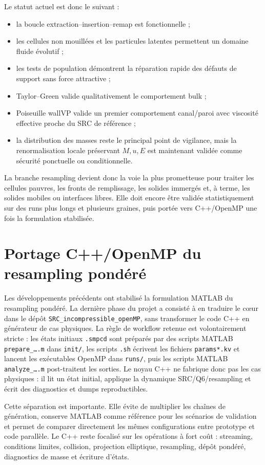 \documentclass[11pt,a4paper]{article}
\begin{document}
Le statut actuel est donc le suivant :
\begin{itemize}
  \item la boucle extraction--insertion--remap est fonctionnelle ;
  \item les cellules non mouillées et les particules latentes permettent un domaine fluide évolutif ;
  \item les tests de population démontrent la réparation rapide des défauts de support sans force attractive ;
  \item Taylor--Green valide qualitativement le comportement bulk ;
  \item Poiseuille wallVP valide un premier comportement canal/paroi avec viscosité effective proche du SRC de référence ;
  \item la distribution des masses reste le principal point de vigilance, mais la renormalisation locale préservant $M,u,E$ est maintenant validée comme sécurité ponctuelle ou conditionnelle.
\end{itemize}
La branche resampling devient donc la voie la plus prometteuse pour traiter les cellules pauvres, les fronts de remplissage, les solides immergés et, à terme, les solides mobiles ou interfaces libres. Elle doit encore être validée statistiquement sur des runs plus longs et plusieurs graines, puis portée vers C++/OpenMP une fois la formulation stabilisée.




\section{Portage C++/OpenMP du resampling pondéré}

Les développements précédents ont stabilisé la formulation MATLAB du resampling pondéré. La dernière phase du projet a consisté à en traduire le cœur dans le dépôt \texttt{SRC\_incompressible\_openMP}, sans transformer le code C++ en générateur de cas physiques. La règle de workflow retenue est volontairement stricte : les états initiaux \texttt{.smpcd} sont préparés par des scripts MATLAB \texttt{prepare\_\dots.m} dans \texttt{init/}, les scripts \texttt{.sh} écrivent les fichiers \texttt{params*.kv} et lancent les exécutables OpenMP dans \texttt{runs/}, puis les scripts MATLAB \texttt{analyze\_\dots.m} post-traitent les sorties. Le noyau C++ ne fabrique donc pas les cas physiques : il lit un état initial, applique la dynamique SRC/Q6/resampling et écrit des diagnostics et dumps reproductibles.

Cette séparation est importante. Elle évite de multiplier les chaînes de génération, conserve MATLAB comme référence pour les scénarios de validation et permet de comparer directement les mêmes configurations entre prototype et code parallèle. Le C++ reste focalisé sur les opérations à fort coût : streaming, conditions limites, collision, projection elliptique, resampling, dépôt pondéré, diagnostics de masse et écriture d'états.
\end{document}
